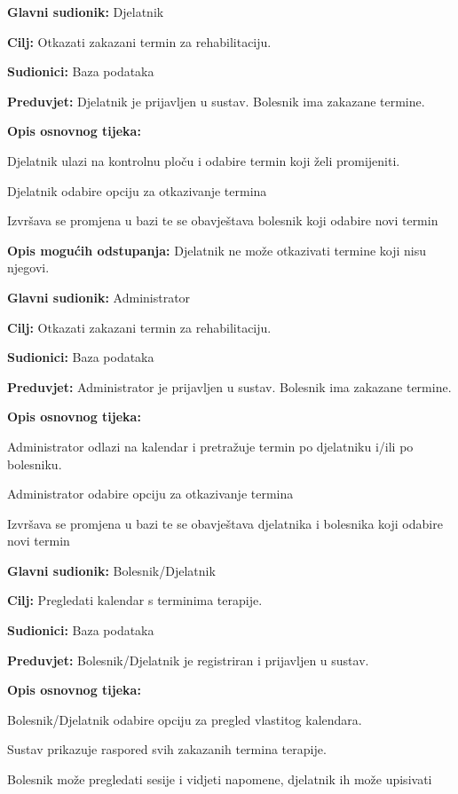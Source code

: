 	\item \textbf{Glavni sudionik:} Djelatnik
	\item \textbf{Cilj:} Otkazati zakazani termin za rehabilitaciju.
	\item \textbf{Sudionici:} Baza podataka
	\item \textbf{Preduvjet:} Djelatnik je prijavljen u sustav. Bolesnik ima zakazane termine.
	\item \textbf{Opis osnovnog tijeka:}
	\begin{packed_enum}
        	\item Djelatnik ulazi na kontrolnu ploču i odabire termin koji želi promijeniti.
		\item Djelatnik odabire opciju za otkazivanje termina 
        	\item Izvršava se promjena u bazi te se obavještava bolesnik koji odabire novi termin 
	\end{packed_enum}
    \item \textbf{Opis mogućih odstupanja:}
	Djelatnik ne može otkazivati termine koji nisu njegovi. 
\closeusecase


	\item \textbf{Glavni sudionik:} Administrator
	\item \textbf{Cilj:} Otkazati zakazani termin za rehabilitaciju.
	\item \textbf{Sudionici:} Baza podataka
	\item \textbf{Preduvjet:} Administrator je prijavljen u sustav. Bolesnik ima zakazane termine.
	\item \textbf{Opis osnovnog tijeka:}
	\begin{packed_enum}
        	\item Administrator odlazi na kalendar i pretražuje termin po djelatniku i/ili po bolesniku.
		\item Administrator odabire opciju za otkazivanje termina 
        	\item Izvršava se promjena u bazi te se obavještava djelatnika i bolesnika koji odabire novi termin 
	\end{packed_enum}
\closeusecase


	\item \textbf{Glavni sudionik:} Bolesnik/Djelatnik
	\item \textbf{Cilj:} Pregledati kalendar s terminima terapije.
	\item \textbf{Sudionici:} Baza podataka
	\item \textbf{Preduvjet:} Bolesnik/Djelatnik je registriran i prijavljen u sustav.
	\item \textbf{Opis osnovnog tijeka:}
	\begin{packed_enum}
		\item Bolesnik/Djelatnik odabire opciju za pregled vlastitog kalendara.
		\item Sustav prikazuje raspored svih zakazanih termina terapije.
        	\item Bolesnik može pregledati sesije i vidjeti napomene, djelatnik ih može upisivati
	\end{packed_enum}
\closeusecase


